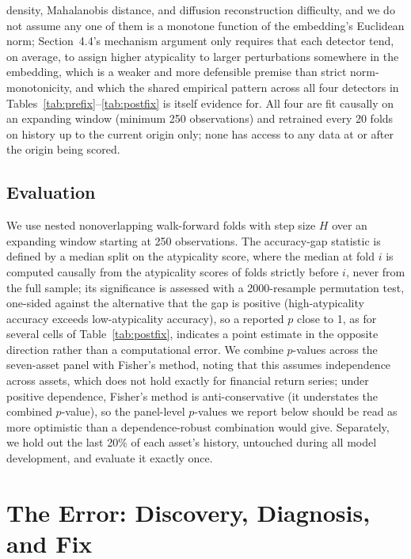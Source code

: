 \documentclass[preprint,12pt]{elsarticle}
\begin{document}
density, Mahalanobis distance, and diffusion reconstruction difficulty, and we do not assume any
one of them is a monotone function of the embedding's Euclidean norm; Section~4.4's mechanism
argument only requires that each detector tend, on average, to assign higher atypicality to
larger perturbations somewhere in the embedding, which is a weaker and more defensible premise
than strict norm-monotonicity, and which the shared empirical pattern across all four detectors
in Tables~\ref{tab:prefix}--\ref{tab:postfix} is itself evidence for. All four are fit causally
on an expanding window (minimum 250 observations) and retrained every 20 folds on history up to
the current origin only; none has access to any data at or after the origin being scored.

\subsection{Evaluation}
We use nested nonoverlapping walk-forward folds with step size $H$ over an expanding window
starting at 250 observations. The accuracy-gap statistic is defined by a median split on the
atypicality score, where the median at fold $i$ is computed causally from the atypicality
scores of folds strictly before $i$, never from the full sample; its significance is assessed
with a 2000-resample permutation test, one-sided against the alternative that the gap is
positive (high-atypicality accuracy exceeds low-atypicality accuracy), so a reported $p$ close
to 1, as for several cells of Table~\ref{tab:postfix}, indicates a point estimate in the
opposite direction rather than a computational error. We combine $p$-values across the seven-asset panel with
Fisher's method, noting that this assumes independence across assets, which does not hold
exactly for financial return series; under positive dependence, Fisher's method is
anti-conservative (it understates the combined $p$-value), so the panel-level $p$-values we
report below should be read as more optimistic than a dependence-robust combination would give.
Separately, we hold out the last 20\% of each asset's history, untouched during all model
development, and evaluate it exactly once.

\section{The Error: Discovery, Diagnosis, and Fix}
\label{sec:error}
\end{document}
